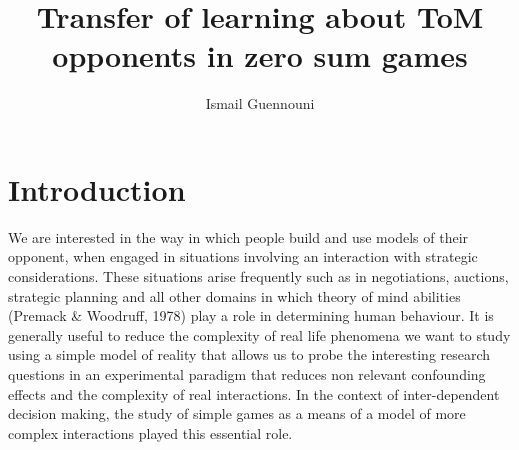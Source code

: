 \documentclass[12pt]{article}         %
\title{Transfer of learning about ToM opponents in zero sum games}  %
\author{Ismail Guennouni}             %
\begin{document}



\maketitle              %




\section*{Introduction}

We are interested in the way in which people build and use models of their opponent, when engaged in situations involving an interaction with strategic considerations. These situations arise frequently such as in negotiations, auctions, strategic planning and all other domains in which theory of mind abilities (Premack & Woodruff, 1978) play a role in determining human behaviour. It is generally useful to reduce the complexity of real life phenomena we want to study using a simple model of reality that allows us to probe the interesting research questions in an experimental paradigm that reduces non relevant confounding effects and the complexity of real interactions. In the context of inter-dependent decision making, the study of simple games as a means of a model of more complex interactions played this essential role. \\
\end{document}
